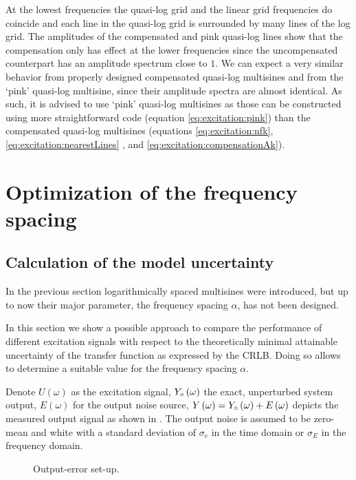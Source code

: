   At the lowest frequencies the quasi-log grid and the linear grid frequencies do coincide and each line in the quasi-log grid is surrounded by many lines of the log grid.
  The amplitudes of the compensated and pink quasi-log lines show that the compensation only has effect at the lower frequencies since the uncompensated counterpart has an amplitude spectrum close to $1$.
  We can expect a very similar behavior from properly designed compensated quasi-log multisines and from the `pink' quasi-log multisine, since their amplitude spectra are almost identical.
  As such, it is advised to use `pink' quasi-log multisines as those can be constructed using more straightforward code (equation \eqref{eq:excitation:pink}) than the compensated quasi-log multisines (equations \eqref{eq:excitation:nfk}, \eqref{eq:excitation:nearestLines} , and \eqref{eq:excitation:compensationAk}).

\section{Optimization of the frequency spacing} 
\label{sec:excitation:optimAlpha}
  \subsection{Calculation of the model uncertainty}
  In the previous section logarithmically spaced multisines were introduced, but up to now their major parameter, the frequency spacing $\alpha$, has not been designed.

  In this section we show a possible approach to compare the performance of different excitation signals with respect to the theoretically minimal attainable uncertainty of the transfer function as expressed by the \gls{CRLB}.
  Doing so allows to determine a suitable value for the frequency spacing $\alpha$.

  Denote
    $U  \left(\omega\right)$ as the excitation signal,
    ${Y}_{\circ}\left(\omega\right)$ the exact, unperturbed system output,
    $E  \left(\omega\right)$ for the output noise source,
    $Y  \left(\omega\right) = {Y}_{\circ}\left( \omega \right) + E\left( \omega \right)$ depicts the measured output signal as shown in .
    The output noise is assumed to be zero-mean and white with a standard deviation of $\sigma_e$ in the time domain or $\sigma_E$ in the frequency domain.

  \begin{figure}[h]
    \centering
    
    \caption[Output-error]{Output-error set-up.}
    \label{fig:excitation:OE}
  \end{figure}

